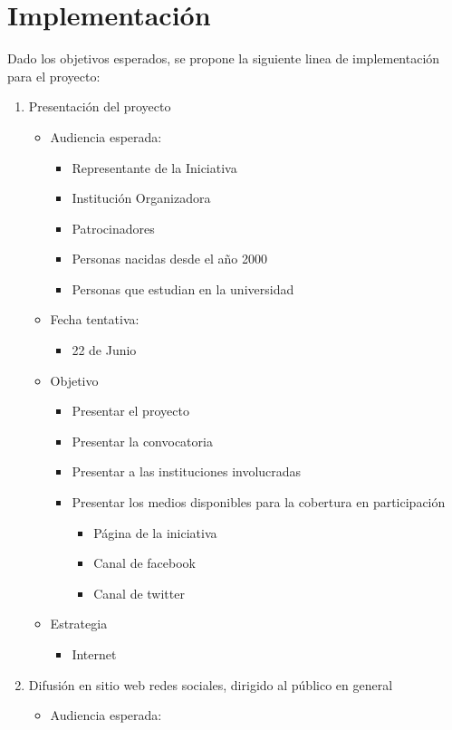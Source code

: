 \documentclass{article}
\begin{document}
\section{Implementación}

Dado los objetivos esperados, se propone la siguiente linea de implementación para el proyecto:

\begin{enumerate}
\item Presentación del proyecto
\begin{itemize}
\item Audiencia esperada:
\begin{itemize}
\item Representante de la Iniciativa
\item Institución Organizadora
\item Patrocinadores
\item Personas nacidas desde el año 2000
\item Personas que estudian en la universidad
\end{itemize}
\item Fecha tentativa:
\begin{itemize}
\item 22 de Junio
\end{itemize}
\item Objetivo
\begin{itemize}
\item Presentar el proyecto
\item Presentar la convocatoria
\item Presentar a las instituciones involucradas
\item Presentar los medios disponibles para la cobertura en participación
\begin{itemize}
\item Página de la iniciativa 
\item Canal de facebook
\item Canal de twitter
\end{itemize}
\end{itemize}
\item Estrategia
\begin{itemize}
\item Internet
\end{itemize}
\end{itemize}
\item Difusión en sitio web redes sociales, dirigido al público en general 
\begin{itemize}
\item Audiencia esperada:

\end{itemize}
\end{enumerate}
\end{document}
